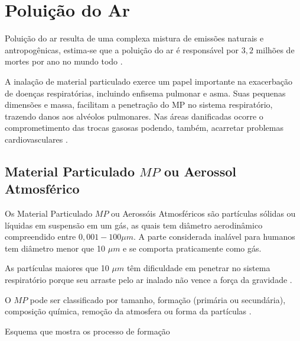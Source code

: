 \section{Poluição do Ar}

Poluição do ar resulta de uma complexa mistura de emissões naturais e 
antropogênicas, estima-se que a poluição do ar é responsável por 
$3,2$ milhões de mortes por ano no mundo todo \cite{lim2013}.

A inalação de material particulado exerce um papel importante na 
exacerbação de doenças respiratórias, incluindo enfisema pulmonar e asma. 
Suas pequenas dimensões e massa, facilitam a penetração do MP no sistema 
respiratório, trazendo danos aos alvéolos pulmonares. 
Nas áreas danificadas ocorre o comprometimento das 
trocas gasosas podendo, também, acarretar problemas cardiovasculares
\cite{arbex2012}.

\subsection{Material Particulado $MP$ ou Aerossol Atmosférico}

Os Material Particulado $MP$ ou  Aerossóis Atmosféricos são partículas
sólidas ou líquidas em suspensão em um gás, as quais tem diâmetro 
aerodinâmico compreendido  entre $0,001-100\mu m$. 
A parte considerada inalável para humanos tem diâmetro menor que 10 $\mu m$
e se comporta praticamente como gás.

As partículas maiores que 10 $\mu m$ têm dificuldade em penetrar 
no sistema respiratório porque seu arraste pelo ar inalado não vence 
a força da gravidade \cite{seinfeld1998}.

O $MP$ pode ser classificado por tamanho, formação 
(primária ou secundária), composição química, remoção da atmosfera ou 
forma da partículas \citep{seinfeld1998}.

Esquema que mostra os processo de formação 

